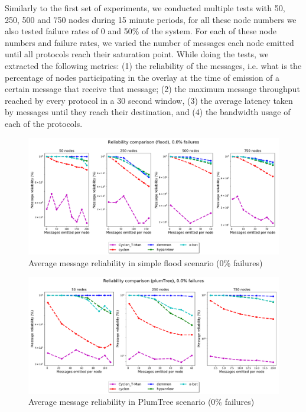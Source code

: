 Similarly to the first set of experiments, we conducted multiple tests with 50, 250, 500 and 750 nodes during 15 minute periods, for all these node numbers we also tested failure rates of 0 and 50\% of the system. For each of these node numbers and failure rates, we varied the number of messages each node emitted until all protocols reach their saturation point. While doing the tests, we extracted the following metrics: (1) the reliability of the messages, i.e. what is the percentage of nodes participating in the overlay at the time of emission of a certain message that receive that message; (2) the maximum message throughput reached by every protocol in a 30 second window, (3) the average latency taken by messages until they reach their destination, and (4) the bandwidth usage of each of the protocols. 

\begin{figure}[htbp]
    \centering
    \includegraphics[width=\linewidth]{Chapters/evaluation/figures/flood/flood_0.0_failures_reliability.pdf}
    \caption{Average message reliability in simple flood scenario (0\% failures)}
    \label{fig:overlay_proto_res_msg_diss:0_failures_reliability_flood}
\end{figure}

\begin{figure}[htbp]
    \centering
    \includegraphics[width=\linewidth]{Chapters/evaluation/figures/flood/plumTree_0.0_failures_reliability.pdf}
    \caption{Average message reliability in PlumTree scenario (0\% failures)}
    \label{fig:overlay_proto_res_msg_diss:0_failures_reliability_plumTree}
\end{figure}

